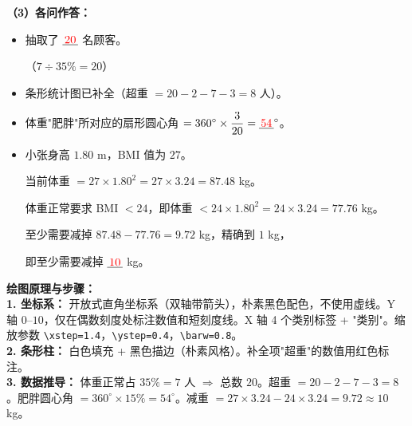 \begin{center}
\end{center}

\vspace{0.4cm}
\textbf{（3）各问作答：}

\begin{itemize}
    \item[\textbf{(1)}] 抽取了 $\underline{\textcolor{red}{\,20\,}}$ 名顾客。

    （$7 \div 35\% = 20$）

    \item[\textbf{(2)}] 条形统计图已补全（超重 $= 20 - 2 - 7 - 3 = 8$ 人）。

    \item[\textbf{(3)}] 体重"肥胖"所对应的扇形圆心角 $= 360^\circ \times \dfrac{3}{20} = \underline{\textcolor{red}{\,54\,}}^\circ$。

    \item[\textbf{(4)}] 小张身高 $1.80$ m，BMI 值为 $27$。

    当前体重 $= 27 \times 1.80^2 = 27 \times 3.24 = 87.48$ kg。

    体重正常要求 BMI $< 24$，即体重 $< 24 \times 1.80^2 = 24 \times 3.24 = 77.76$ kg。

    至少需要减掉 $87.48 - 77.76 = 9.72$ kg，精确到 $1$ kg，

    即至少需要减掉 $\underline{\textcolor{red}{\,10\,}}$ kg。
\end{itemize}

\vspace{0.4cm}
{\small\color{blue!70!black}
\textbf{绘图原理与步骤：}\\
\textbf{1. 坐标系：} 开放式直角坐标系（双轴带箭头），朴素黑色配色，不使用虚线。Y 轴 $0$--$10$，仅在偶数刻度处标注数值和短刻度线。X 轴 4 个类别标签 + "类别"。缩放参数 \texttt{\textbackslash{}xstep=1.4}，\texttt{\textbackslash{}ystep=0.4}，\texttt{\textbackslash{}barw=0.8}。\\
\textbf{2. 条形柱：} 白色填充 + 黑色描边（朴素风格）。补全项"超重"的数值用红色标注。\\
\textbf{3. 数据推导：} 体重正常占 $35\% = 7$ 人 $\Rightarrow$ 总数 $20$。超重 $= 20 - 2 - 7 - 3 = 8$。肥胖圆心角 $= 360^\circ \times 15\% = 54^\circ$。减重 $= 27 \times 3.24 - 24 \times 3.24 = 9.72 \approx 10$ kg。
}

